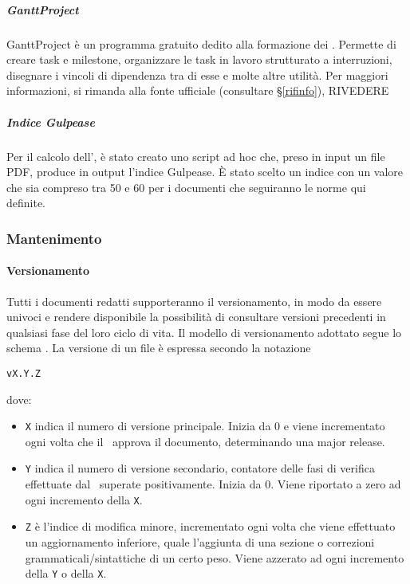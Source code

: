 			\subparagraph{GanttProject} %
			GanttProject è un programma gratuito dedito alla formazione dei . Permette di creare task e milestone, organizzare le task
			in lavoro strutturato a interruzioni, disegnare i vincoli di dipendenza tra di esse e molte altre utilità.
			Per maggiori informazioni, si rimanda alla fonte ufficiale (consultare \S\ref{rifinfo}), RIVEDERE

			\subparagraph{Indice Gulpease}
			Per il calcolo dell', è stato creato uno script ad hoc che, preso in input un file PDF, produce in output l'indice Gulpease.
			È stato scelto un indice con un valore che sia compreso tra 50 e 60 per i documenti che seguiranno le norme qui definite.

		\subsubsection{Mantenimento}

			\paragraph{Versionamento} \label{Versionamento}
			Tutti i documenti redatti supporteranno il versionamento, in modo da essere univoci e rendere disponibile la possibilità di consultare versioni precedenti
			in qualsiasi fase del loro ciclo di vita.
			Il modello di versionamento adottato segue lo schema . La versione di un file è espressa secondo la notazione
			\begin{center}
				\texttt{vX.Y.Z}
			\end{center}
			\indent dove:
			\begin{itemize}
				\item \texttt{X} indica il numero di versione principale. Inizia da 0 e viene incrementato ogni volta che il \Res\ approva il documento, determinando
					una major release.
				\item \texttt{Y} indica il numero di versione secondario, contatore delle fasi di verifica effettuate dal \Ver\ superate positivamente. Inizia da 0.
					Viene riportato a zero ad ogni incremento della \texttt{X}.
				\item \texttt{Z} è l'indice di modifica minore, incrementato ogni volta che viene effettuato un aggiornamento inferiore, quale l'aggiunta di una sezione
					o correzioni grammaticali/sintattiche di un certo peso. Viene azzerato ad ogni incremento della \texttt{Y} o della \texttt{X}.
			\end{itemize}

